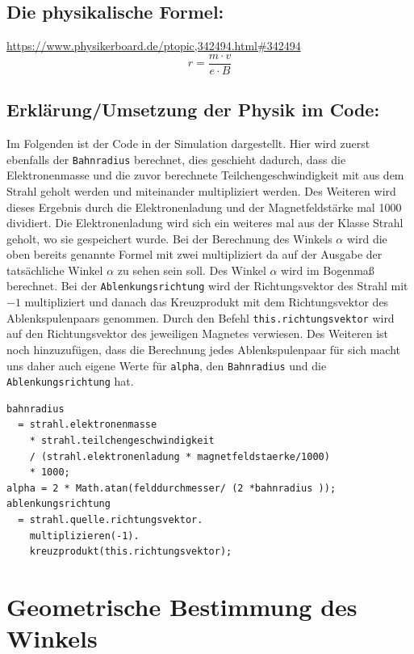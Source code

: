 \subsection{Die physikalische Formel:}
\url{https://www.physikerboard.de/ptopic,342494.html#342494}
\begin{equation}
     \label{eq:r}
     r = \frac{m \cdot v}{e \cdot B}
\end{equation}


\subsection{Erklärung/Umsetzung der Physik im Code:}

Im Folgenden ist der Code in der Simulation dargestellt. Hier wird zuerst ebenfalls der \lstinline$Bahnradius$ berechnet, dies geschieht dadurch, dass die Elektronenmasse und die zuvor berechnete Teilchengeschwindigkeit mit aus dem Strahl geholt werden und miteinander multipliziert werden. Des Weiteren wird dieses Ergebnis durch die Elektronenladung und der Magnetfeldstärke mal 1000 dividiert. Die Elektronenladung wird sich ein weiteres mal aus der Klasse Strahl geholt, wo sie gespeichert wurde. Bei der Berechnung des Winkels $\alpha$ wird die oben %
bereits genannte Formel mit zwei multipliziert da auf der Ausgabe der tatsächliche Winkel $\alpha$ zu sehen sein soll. Des Winkel $\alpha$ wird im Bogenmaß berechnet. Bei der \lstinline$Ablenkungsrichtung$ wird der Richtungsvektor des Strahl mit $-1$ multipliziert und danach das Kreuzprodukt mit dem Richtungsvektor des Ablenkspulenpaars genommen. Durch den Befehl \lstinline$this.richtungsvektor$ wird auf den Richtungsvektor des jeweiligen Magnetes verwiesen. Des Weiteren ist noch hinzuzufügen, dass die Berechnung jedes Ablenkspulenpaar für sich macht uns daher auch eigene Werte für \lstinline$alpha$, den \lstinline$Bahnradius$ und die \lstinline$Ablenkungsrichtung$ hat.
\begin{lstlisting}
bahnradius
  = strahl.elektronenmasse
    * strahl.teilchengeschwindigkeit
    / (strahl.elektronenladung * magnetfeldstaerke/1000)
    * 1000;
alpha = 2 * Math.atan(felddurchmesser/ (2 *bahnradius ));
ablenkungsrichtung
  = strahl.quelle.richtungsvektor.
    multiplizieren(-1).
    kreuzprodukt(this.richtungsvektor);
\end{lstlisting}

\section{Geometrische Bestimmung des Winkels}

